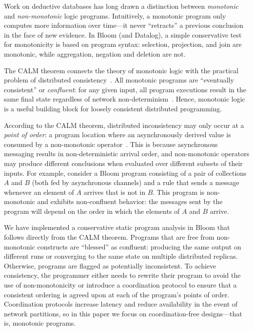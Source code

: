Work on deductive databases has long drawn a distinction between
\emph{monotonic} and \emph{non-monotonic} logic programs. Intuitively, a
monotonic program only computes more information over time---it never
``retracts'' a previous conclusion in the face of new evidence.  In Bloom
(and Datalog), a simple conservative test for monotonicity is based on program
syntax: selection, projection, and join are monotonic, while aggregation,
negation and deletion are not.

The CALM theorem connects the theory of monotonic logic with the practical
problem of distributed consistency~\cite{Alvaro2011,Hellerstein2010}.  All
monotonic programs are ``eventually consistent'' or \emph{confluent}: for any
given input, all program executions result in the same final state regardless of
network non-determinism~\cite{Ameloot2011,dedalus-confluence}.  Hence, monotonic
logic is a useful building block for loosely consistent distributed programming.

According to the CALM theorem, distributed inconsistency may only occur at a
\emph{point of order}: a program location where an asynchronously derived value
is consumed by a non-monotonic operator~\cite{Alvaro2011}.  This is because
asynchronous messaging results in non-deterministic arrival order, and
non-monotonic operators may produce different conclusions when evaluated over
different subsets of their inputs.  For example, consider a Bloom program
consisting of a pair of collections $A$ and $B$ (both fed by asynchronous
channels) and a rule that sends a message whenever an element of $A$ arrives
that is not in $B$.  This program is non-monotonic and exhibits non-confluent
behavior: the messages sent by the program will depend on the order in which the
elements of $A$ and $B$ arrive.

We have implemented a conservative static program analysis in Bloom that follows
directly from the CALM theorem.  Programs that are free from non-monotonic
constructs are ``blessed'' as confluent: producing the same output on different
runs or converging to the same state on multiple distributed replicas.
Otherwise, programs are flagged as potentially inconsistent.  To achieve
consistency, the programmer either needs to rewrite their program to avoid the
use of non-monotonicity or introduce a coordination protocol to ensure that a
consistent ordering is agreed upon at each of the program's points of order.
Coordination protocols increase latency and reduce availability in the event of
network partitions, so in this paper we focus on coordination-free
designs---that is, monotonic programs.

